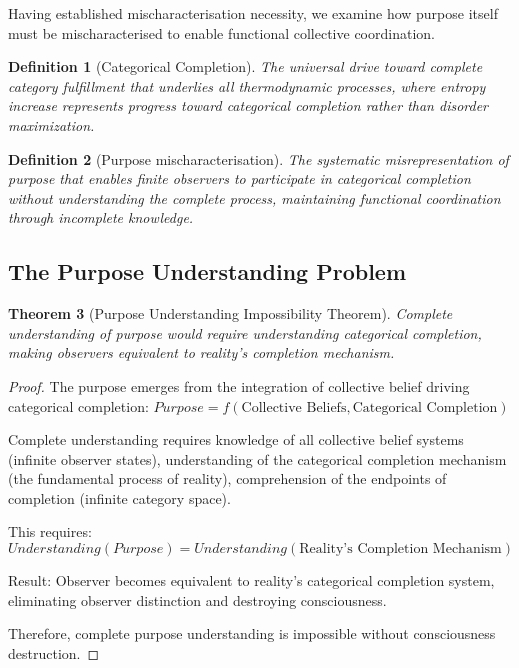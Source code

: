 \documentclass[12pt,a4paper]{article}
\newtheorem{theorem}{Theorem}[section]
\newtheorem{definition}[theorem]{Definition}
\begin{document}
Having established mischaracterisation necessity, we examine how purpose itself must be mischaracterised to enable functional collective coordination.

\begin{definition}[Categorical Completion]
The universal drive toward complete category fulfillment that underlies all thermodynamic processes, where entropy increase represents progress toward categorical completion rather than disorder maximization.
\end{definition}

\begin{definition}[Purpose mischaracterisation]
The systematic misrepresentation of purpose that enables finite observers to participate in categorical completion without understanding the complete process, maintaining functional coordination through incomplete knowledge.
\end{definition}

\subsection{The Purpose Understanding Problem}

\begin{theorem}[Purpose Understanding Impossibility Theorem]
Complete understanding of purpose would require understanding categorical completion, making observers equivalent to reality's completion mechanism.
\end{theorem}

\begin{proof}
The purpose emerges from the integration of collective belief driving categorical completion: $Purpose = f(\text{Collective Beliefs}, \text{Categorical Completion})$

Complete understanding requires knowledge of all collective belief systems (infinite observer states), understanding of the categorical completion mechanism (the fundamental process of reality), comprehension of the endpoints of completion (infinite category space).

This requires: $Understanding(Purpose) = Understanding(\text{Reality's Completion Mechanism})$

Result: Observer becomes equivalent to reality's categorical completion system, eliminating observer distinction and destroying consciousness.

Therefore, complete purpose understanding is impossible without consciousness destruction.
\end{proof}
\end{document}

